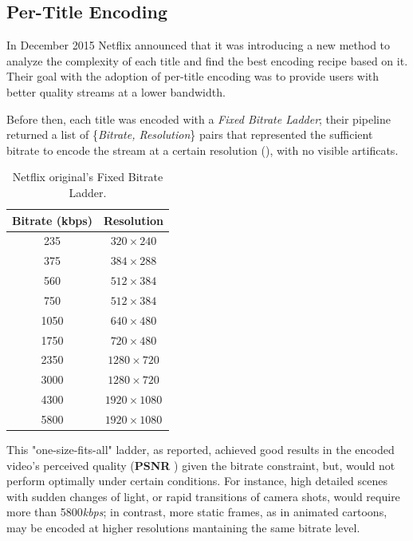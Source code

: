 \subsection{Per-Title Encoding}\label{sec:per-title-encoding}

In December 2015 Netflix announced \cite{per-title-encoding} that it was
introducing a new method to analyze the complexity of each title and find the
best encoding recipe based on it. Their goal with the adoption of
per-title encoding was to provide users with better quality streams at a lower
bandwidth. 

Before then, each title was encoded with a \emph{Fixed Bitrate Ladder}; their
pipeline returned a list of \{\emph{Bitrate, Resolution}\} pairs that
represented the sufficient bitrate to encode the stream at a certain
resolution (), with no visible artificats.

\begin{table}[htb]
  \centering
  \begin{tabular}{|c|c|}
    \hline
    \textbf{Bitrate (kbps)} & \textbf{Resolution} \\
    \hline
    235                     &    $320\times240$ \\
    \hline
    375                     &    $384\times288$ \\
    \hline
    560                     &    $512\times384$ \\
    \hline
    750                     &    $512\times384$ \\
    \hline
    1050                    &    $640\times480$ \\
    \hline
    1750                    &    $720\times480$ \\
    \hline
    2350                    &   $1280\times720$ \\
    \hline
    3000                    &   $1280\times720$ \\
    \hline
    4300                    &   $1920\times1080$ \\
    \hline
    5800                    &   $1920\times1080$ \\
    \hline
  \end{tabular}
  \caption{Netflix original's Fixed Bitrate Ladder.}
  \label{tab:fixed-ladder}
\end{table}

This "one-size-fits-all" ladder, as reported, achieved good results in the
encoded video's perceived quality (\textbf{PSNR} \cite{psnr}) given the bitrate
constraint, but, would not perform optimally under certain conditions. For
instance, high detailed scenes with sudden changes of light, or rapid
transitions of camera shots, would require more than 5800\emph{kbps}; in
contrast, more static frames, as in animated cartoons, may be encoded at higher
resolutions mantaining the same bitrate level.

